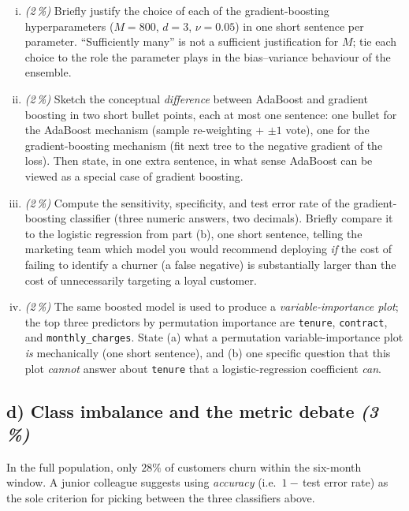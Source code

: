 \documentclass[11pt,a4paper]{article}
\newcommand{\subpoints}[1]{\textit{(#1\,\%)}}
\begin{document}
\begin{enumerate}[(i)]
  \item \subpoints{2} Briefly justify the choice of each of the gradient-boosting hyperparameters ($M = 800$, $d = 3$, $\nu = 0.05$) in one short sentence per parameter. ``Sufficiently many'' is not a sufficient justification for $M$; tie each choice to the role the parameter plays in the bias--variance behaviour of the ensemble.

  \item \subpoints{2} Sketch the conceptual \emph{difference} between AdaBoost and gradient boosting in two short bullet points, each at most one sentence: one bullet for the AdaBoost mechanism (sample re-weighting + $\pm 1$ vote), one for the gradient-boosting mechanism (fit next tree to the negative gradient of the loss). Then state, in one extra sentence, in what sense AdaBoost can be viewed as a special case of gradient boosting.

  \item \subpoints{2} Compute the sensitivity, specificity, and test error rate of the gradient-boosting classifier (three numeric answers, two decimals). Briefly compare it to the logistic regression from part (b), one short sentence, telling the marketing team which model you would recommend deploying \emph{if} the cost of failing to identify a churner (a false negative) is substantially larger than the cost of unnecessarily targeting a loyal customer.

  \item \subpoints{2} The same boosted model is used to produce a \emph{variable-importance plot}; the top three predictors by permutation importance are \texttt{tenure}, \texttt{contract}, and \texttt{monthly\_charges}. State (a) what a permutation variable-importance plot \emph{is} mechanically (one short sentence), and (b) one specific question that this plot \emph{cannot} answer about \texttt{tenure} that a logistic-regression coefficient \emph{can}.
\end{enumerate}

\subsection*{d) Class imbalance and the metric debate \subpoints{3}}

In the full population, only $28\%$ of customers churn within the six-month window. A junior colleague suggests using \emph{accuracy} (i.e.\ $1 -$\,test error rate) as the sole criterion for picking between the three classifiers above.
\end{document}
